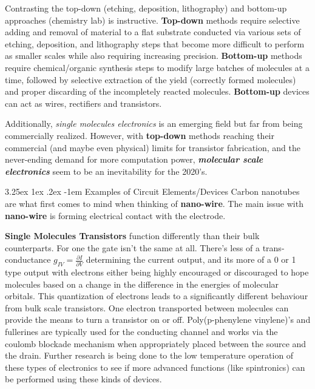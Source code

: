\documentclass{article}
\makeatletter
\renewcommand\subparagraph{\@startsection{subparagraph}{6}{\parindent}%
  {3.25ex \@plus1ex \@minus .2ex}%
  {-1em}%
  {\normalfont\normalsize\bfseries}}
\makeatother
\begin{document}
Contrasting the top-down (etching, deposition, lithography) and bottom-up approaches (chemistry lab) is instructive. \textbf{Top-down} methods require selective adding and removal of material to a flat substrate conducted via various sets of etching, deposition, and lithography steps that become more difficult to perform as smaller scales while also requiring increasing precision. \textbf{Bottom-up} methods require chemical/organic synthesis steps to modify large batches of molecules at a time, followed by selective extraction of the yield (correctly formed molecules) and proper discarding of the incompletely reacted molecules. \textbf{Bottom-up} devices can act as wires, rectifiers and transistors. 

Additionally, \textit{single molecules electronics} is an emerging field but far from being commercially realized. However, with \textbf{top-down} methods reaching their commercial (and maybe even physical) limits for transistor fabrication, and the never-ending demand for more computation power, \textbf{\textit{molecular scale electronics}} seem to be an inevitability for the 2020's. 

\newpage

\subparagraph{Examples of Circuit Elements/Devices}
Carbon nanotubes are what first comes to mind when thinking of \textbf{nano-wire}. The main issue with \textbf{nano-wire} is forming electrical contact with the electrode. 

\textbf{Single Molecules Transistors} function differently than their bulk counterparts. For one the gate isn't the same at all. There's less of a trans-conductance \begin{math} g_{IV} = \frac{\partial{I}}{\partial{V}} \end{math} determining the current output, and its more of a 0 or 1 type output with electrons either being highly encouraged or discouraged to hope molecules based on a change in the difference in the energies of molecular orbitals. This quantization of electrons leads to a significantly different behaviour from bulk scale transistors. One electron transported between molecules can provide the means to turn a transistor on or off. Poly(p-phenylene vinylene)'s and fullerines are typically used for the conducting channel and works via the coulomb blockade mechanism when appropriately placed between the source and the drain. Further research is being done to the low temperature operation of these types of electronics to see if more advanced functions (like spintronics) can be performed using these kinds of devices. 
\end{document}
